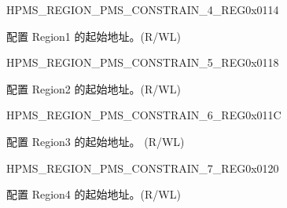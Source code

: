 \begin{register}{H}{PMS\_REGION\_PMS\_CONSTRAIN\_4\_REG}{0x0114}\label{regdesc:PMSREGIONPMSCONSTRAIN4REG}
%
%
\regnewline%
\begin{regdesc}\begin{reglist}
\label{fielddesc:PMSREGIONPMSCONSTRAINADDR1}\item [PMS\_REGION\_PMS\_CONSTRAIN\_ADDR\_1] 配置 Region1 的起始地址。(R/WL)
\end{reglist}\end{regdesc}
\end{register}


\begin{register}{H}{PMS\_REGION\_PMS\_CONSTRAIN\_5\_REG}{0x0118}\label{regdesc:PMSREGIONPMSCONSTRAIN5REG}
%
%
\regnewline%
\begin{regdesc}\begin{reglist}
\label{fielddesc:PMSREGIONPMSCONSTRAINADDR2}\item [PMS\_REGION\_PMS\_CONSTRAIN\_ADDR\_2] 配置 Region2 的起始地址。(R/WL)
\end{reglist}\end{regdesc}
\end{register}


\begin{register}{H}{PMS\_REGION\_PMS\_CONSTRAIN\_6\_REG}{0x011C}\label{regdesc:PMSREGIONPMSCONSTRAIN6REG}
%
%
\regnewline%
\begin{regdesc}\begin{reglist}
\label{fielddesc:PMSREGIONPMSCONSTRAINADDR3}\item [PMS\_REGION\_PMS\_CONSTRAIN\_ADDR\_3] 配置 Region3 的起始地址。 (R/WL)
\end{reglist}\end{regdesc}
\end{register}


\begin{register}{H}{PMS\_REGION\_PMS\_CONSTRAIN\_7\_REG}{0x0120}\label{regdesc:PMSREGIONPMSCONSTRAIN7REG}
%
%
\regnewline%
\begin{regdesc}\begin{reglist}
\label{fielddesc:PMSREGIONPMSCONSTRAINADDR4}\item [PMS\_REGION\_PMS\_CONSTRAIN\_ADDR\_4] 配置 Region4 的起始地址。(R/WL)
\end{reglist}\end{regdesc}
\end{register}


